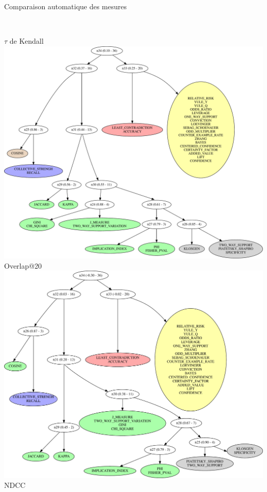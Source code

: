 \documentclass[table]{beamer}
\begin{document}
\begin{frame}[t]{Comparaison automatique des mesures}
{\begin{columns}[t]
        \\\vspace{1em}
        $\tau$ de Kendall
        \centering
        \includegraphics[width=\linewidth]{fig/dendograms/patterns_demo-perTarget-OVERLAP_AT_20.pdf}
        \\\vspace{1em}
        Overlap@20
        \centering
        \includegraphics[width=\linewidth]{fig/dendograms/patterns_demo-perTarget-NDCG.pdf}
        \\\vspace{1em}
        NDCC
    \end{columns}
  }
\end{frame}
\end{document}
